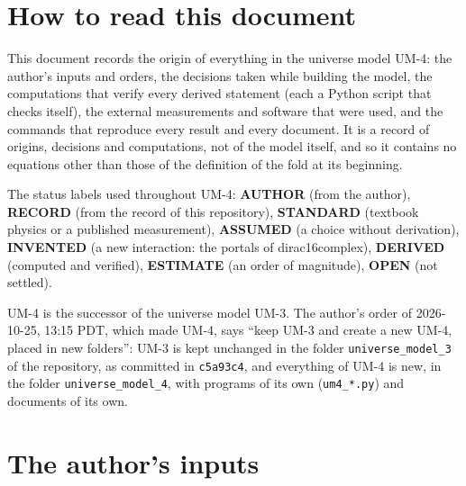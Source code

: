\documentclass[
  10pt,
]{article}
\begin{document}
\hypertarget{how-to-read-this-document}{%
\section{How to read this document}\label{how-to-read-this-document}}

This document records the origin of everything in the universe model
UM-4: the author's inputs and orders, the decisions taken while building
the model, the computations that verify every derived statement (each a
Python script that checks itself), the external measurements and
software that were used, and the commands that reproduce every result
and every document. It is a record of origins, decisions and
computations, not of the model itself, and so it contains no equations
other than those of the definition of the fold at its beginning.

The status labels used throughout UM-4: \textbf{AUTHOR} (from the
author), \textbf{RECORD} (from the record of this repository),
\textbf{STANDARD} (textbook physics or a published measurement),
\textbf{ASSUMED} (a choice without derivation), \textbf{INVENTED} (a new
interaction: the portals of dirac16complex), \textbf{DERIVED} (computed
and verified), \textbf{ESTIMATE} (an order of magnitude), \textbf{OPEN}
(not settled).

UM-4 is the successor of the universe model UM-3. The author's order of
2026-10-25, 13:15 PDT, which made UM-4, says ``keep UM-3 and create a
new UM-4, placed in new folders'': UM-3 is kept unchanged in the folder
\texttt{universe\_model\_3} of the repository, as committed in
\texttt{c5a93c4}, and everything of UM-4 is new, in the folder
\texttt{universe\_model\_4}, with programs of its own
(\texttt{um4\_*.py}) and documents of its own.

\hypertarget{the-authors-inputs}{%
\section{The author's inputs}\label{the-authors-inputs}}
\end{document}
